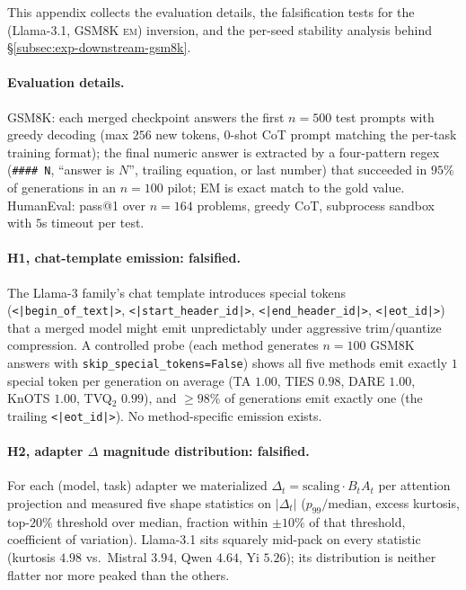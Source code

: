 This appendix collects the evaluation details, the falsification tests
for the (Llama-3.1, GSM8K \textsc{em}) inversion, and the per-seed
stability analysis behind \S\ref{subsec:exp-downstream-gsm8k}.

\paragraph{Evaluation details.} GSM8K: each merged checkpoint answers
the first $n = 500$ test prompts with greedy decoding (max $256$ new
tokens, $0$-shot CoT prompt matching the per-task training format);
the final numeric answer is extracted by a four-pattern regex
(\verb|#### N|, ``answer is $N$'', trailing equation, or last number)
that succeeded in $95\%$ of generations in an $n = 100$ pilot; EM is
exact match to the gold value. HumanEval: pass@1 over $n = 164$
problems, greedy CoT, subprocess sandbox with $5$s timeout per test.

\paragraph{H1, chat-template emission: falsified.} The Llama-3
family's chat template introduces special tokens
(\verb!<|begin_of_text|>!, \verb!<|start_header_id|>!,
\verb!<|end_header_id|>!, \verb!<|eot_id|>!) that a merged model might
emit unpredictably under aggressive trim/quantize compression. A
controlled probe (each method generates $n = 100$ GSM8K answers with
\verb|skip_special_tokens=False|) shows all five methods emit exactly
$1$ special token per generation on average (TA $1.00$, TIES $0.98$,
DARE $1.00$, KnOTS $1.00$, TVQ$_2$ $0.99$), and $\geq 98\%$ of
generations emit exactly one (the trailing \verb!<|eot_id|>!). No
method-specific emission exists.

\paragraph{H2, adapter $\Delta$ magnitude distribution: falsified.}
For each (model, task) adapter we materialized
$\Delta_t = \mathrm{scaling}\cdot B_t A_t$ per attention projection and
measured five shape statistics on $|\Delta_t|$
($p_{99}/\mathrm{median}$, excess kurtosis, top-$20\%$ threshold over
median, fraction within $\pm 10\%$ of that threshold, coefficient of
variation). Llama-3.1 sits squarely mid-pack on every statistic
(kurtosis $4.98$ vs.\ Mistral $3.94$, Qwen $4.64$, Yi $5.26$); its
distribution is neither flatter nor more peaked than the others.

